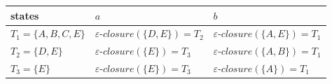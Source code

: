 \documentclass{standalone}
\providecommand\lightrule{%
	\arrayrulecolor{black!30}%
	\midrule[\lightrulewidth]%
	\arrayrulecolor{black}}
\begin{document}
\begin{tabularx}{\textwidth}{XXX}
        states & \(a\) & \(b\) \\
        \midrule
            \(T_1 = \{A, B, C, E\}\)
            &
            \(\varepsilon \textrm{-}closure(\{D, E\}) = T_2\)
            &
            \(\varepsilon \textrm{-}closure(\{A, E\}) = T_1\)
            \\ \lightrule
            \(T_2 = \{D, E\}\)
            &
            \(\varepsilon \textrm{-}closure(\{E\}) = T_3\)
            &
            \(\varepsilon \textrm{-}closure(\{A, B\}) = T_1\)
            \\ \lightrule
            \(T_3 = \{E\}\)
            &
            \(\varepsilon \textrm{-}closure(\{E\}) = T_3\)
            &
            \(\varepsilon \textrm{-}closure(\{A\}) = T_1\)
\end{tabularx}
\end{document}
